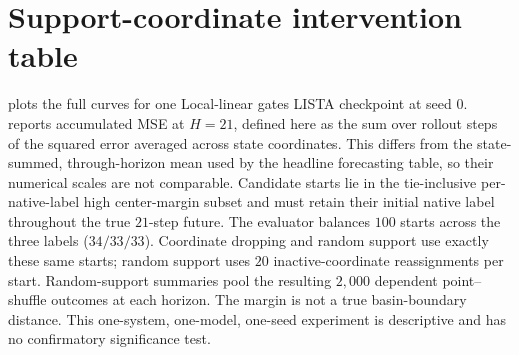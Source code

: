 \section{Support-coordinate intervention table}
\label{app:support_coordinate_interventions}

 plots the full curves for one Local-linear gates LISTA checkpoint at seed \(0\).  reports accumulated MSE at \(H=21\), defined here as the sum over rollout steps of the squared error averaged across state coordinates. This differs from the state-summed, through-horizon mean used by the headline forecasting table, so their numerical scales are not comparable. Candidate starts lie in the tie-inclusive per-native-label high center-margin subset and must retain their initial native label throughout the true \(21\)-step future. The evaluator balances \(100\) starts across the three labels (\(34/33/33\)). Coordinate dropping and random support use exactly these same starts; random support uses \(20\) inactive-coordinate reassignments per start. Random-support summaries pool the resulting \(2{,}000\) dependent point--shuffle outcomes at each horizon. The margin is not a true basin-boundary distance. This one-system, one-model, one-seed experiment is descriptive and has no confirmatory significance test.

\begin{table}[tbp]
\centering
\caption{Accumulated MSE (sum of per-coordinate step MSE) at \(H=21\) for descriptive support-coordinate interventions on the Local-linear gates LISTA checkpoint at seed \(0\). Drop rows summarize \(100\) starts; the random row pools \(2{,}000\) dependent point--shuffle outcomes. Lower is better; no confirmatory inference is attached.}
\label{tab:support_coordinate_interventions_h21}
\resizebox{0.7\textwidth}{!}{}
\end{table}
